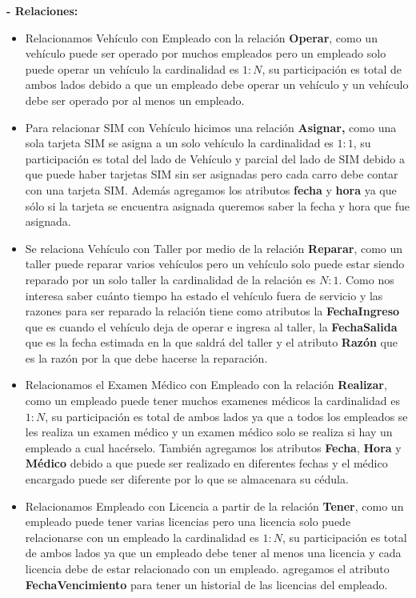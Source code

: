 \documentclass[letterpaper,11pt]{article}
\begin{document}
      \textbf{- Relaciones: }

      \begin{itemize}
      \item Relacionamos Vehículo con Empleado  con la relación
            \textbf{Operar}, como un vehículo puede ser operado por muchos
            empleados pero un empleado solo puede operar un vehículo
            la cardinalidad es $1:N$, su participación es total de ambos
            lados debido a que un empleado debe operar un vehículo y un
            vehículo debe ser operado por al menos un empleado.
      \item Para relacionar SIM con Vehículo hicimos
            una relación \textbf{Asignar,} como una sola tarjeta SIM
            se asigna a un solo vehículo la cardinalidad es $1:1$, su
            participación es total del lado de Vehículo y
            parcial del lado de SIM debido a que puede haber tarjetas SIM
            sin ser asignadas pero cada carro debe contar con una tarjeta
            SIM. Además agregamos los atributos \textbf{fecha} y \textbf{hora}
            ya que sólo si la tarjeta se encuentra asignada queremos saber
            la fecha y hora que fue asignada.
      \item Se relaciona Vehículo con Taller por medio de la relación \textbf{Reparar},  como un taller puede reparar varios vehículos pero un vehículo solo puede estar siendo reparado por un solo taller la cardinalidad de la relación es $N:1$. Como nos interesa saber cuánto tiempo ha estado el vehículo fuera de servicio y las razones  para ser reparado la relación tiene como atributos la \textbf{FechaIngreso} que es cuando el vehículo deja de operar e ingresa al taller, la \textbf{FechaSalida} que es la fecha estimada en la que saldrá del taller y el atributo \textbf{Razón} que es la razón por la que debe hacerse la reparación.
      \item Relacionamos el Examen Médico con Empleado con la relación
            \textbf{Realizar}, como un empleado puede tener muchos
            examenes médicos la cardinalidad es $1:N$, su participación
            es total de ambos lados ya que a todos los empleados se les
            realiza un examen médico y un examen médico solo se realiza
            si hay un empleado a cual hacérselo. También agregamos los
            atributos \textbf{Fecha}, \textbf{Hora} y \textbf{Médico}
            debido a que puede ser realizado en diferentes fechas y el médico
            encargado puede ser diferente por lo que se almacenara su cédula.
      \item Relacionamos Empleado con Licencia a partir de la relación
            \textbf{Tener}, como un empleado puede tener varias licencias
            pero una licencia solo puede relacionarse con un empleado
            la cardinalidad es $1:N$, su participación es total de
            ambos lados ya que un empleado debe tener al menos una licencia
            y cada licencia debe de estar relacionado con un empleado. agregamos
            el atributo \textbf{FechaVencimiento} para tener un historial de
            las licencias del empleado.
      \end{itemize}
\end{document}
